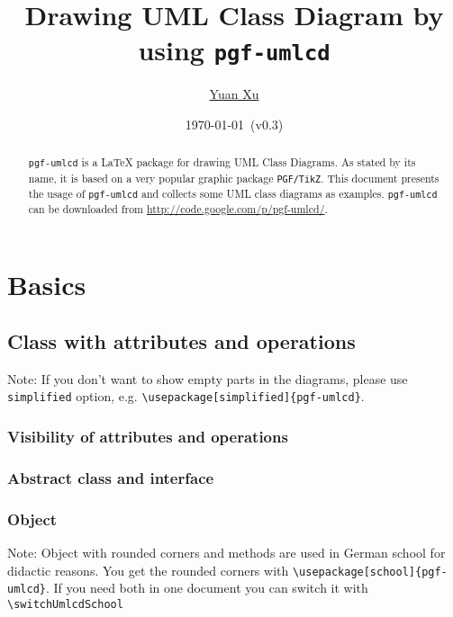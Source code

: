 \documentclass{article}
\newcommand{\demo}[2][1]{
\begin{minipage}{.49\linewidth}
\centering
\resizebox{#1\linewidth}{!}{

}
\end{minipage}
\hspace{0.01\linewidth}
\begin{minipage}{.5\linewidth}

\end{minipage}
}
\begin{document}
\title{Drawing UML Class Diagram by using \texttt{pgf-umlcd}}
\author{\href{mailto:xuyuan.cn@gmail.com}{Yuan Xu}}
\date{\today{}~(v0.3)}
\maketitle

\begin{abstract}
  \texttt{pgf-umlcd} is a LaTeX package for drawing UML Class
  Diagrams. As stated by its name, it is based on a very popular
  graphic package \texttt{PGF/TikZ}. This document presents the usage
  of \texttt{pgf-umlcd} and collects some UML class diagrams as
  examples. \texttt{pgf-umlcd} can be downloaded from
  \href{http://code.google.com/p/pgf-umlcd/}{http://code.google.com/p/pgf-umlcd/}.
\end{abstract}

\tableofcontents

\section{Basics}
\subsection{Class with attributes and operations}
Note: If you don't want to show empty parts in the diagrams, please
use \texttt{simplified} option, e.g. \lstinline|\usepackage[simplified]{pgf-umlcd}|.\\
\demo{class}

\subsubsection{Visibility of attributes and operations}
\demo[0.8]{visibility}

\subsubsection{Abstract class and interface}
\demo[0.5]{abstract-class}
\demo[0.5]{interface}

\subsubsection{Object}
\demo[0.7]{object}
Note: Object with rounded corners and methods are used in German school for didactic reasons. You get the rounded corners with \lstinline|\usepackage[school]{pgf-umlcd}|. If you need both in one document you can switch it with \lstinline|\switchUmlcdSchool| \\
\switchUmlcdSchool
\demo[0.7]{object}
\demo[0.7]{object-include-methods}
\end{document}
